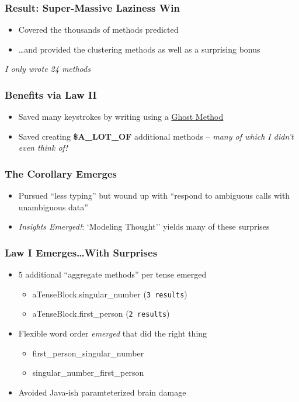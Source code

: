 \documentclass[slidestop,compress,mathserif]{beamer}
\begin{document}
\begin{frame}
	\frametitle{Result:  Super-Massive Laziness Win}
	\begin{itemize}
		\item Covered the thousands of methods predicted
		\pause
		\item \ldots and provided the clustering methods as well as a surprising bonus
	\end{itemize}
	\pause
	\vskip 0.5cm
	\emph{I only wrote 24 methods}
\end{frame}

\begin{frame}
	\frametitle{Benefits via Law II}
	\begin{itemize}
		\item Saved many keystrokes by writing using a \underline{Ghost Method}
		\pause
		\item Saved creating \textbf{\$A\_LOT\_OF} additional methods -- \emph{many of which I didn't even think of!}
	\end{itemize}
\end{frame}

\begin{frame}
	\frametitle{The Corollary Emerges}
	\begin{itemize}
		\item 	Pursued ``less typing'' but wound up with ``respond to ambiguous calls with unambiguous data''
		\pause
		\item  \emph{Insights Emerged!}:  `Modeling Thought'' yields many of these surprises
	\end{itemize}
\end{frame}


\begin{frame}
	\frametitle{Law I Emerges{\ldots}With Surprises}
	\begin{itemize}
		\item 5 additional ``aggregate methods'' per tense emerged
		\begin{itemize}
			\item {aTenseBlock}.singular\_number (\texttt{3 results})
			\item {aTenseBlock}.first\_person (\texttt{2 results})
		\end{itemize}

		\pause

		\item Flexible word order \emph{emerged} that did the right thing
		\begin{itemize}
			\item first\_person\_singular\_number
			\item singular\_number\_first\_person
		\end{itemize}

		\pause

		\item Avoided Java-ish paramteterized brain damage
	\end{itemize}
\end{frame}
\end{document}
